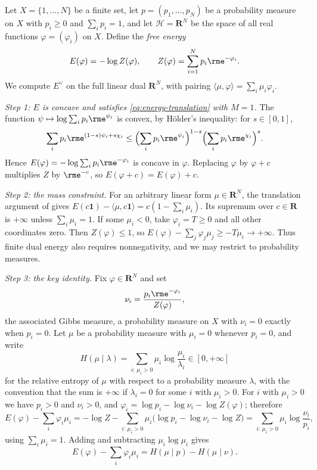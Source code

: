 \begin{example}
\label{ex:legendre-entropy-pair}
Let $X=\{1,\dots,N\}$ be a finite set, let $p=(p_1,\dots,p_N)$ be a
probability measure on $X$ with $p_i\geq0$ and $\sum_ip_i=1$, and let
$\mathcal H=\mathbf R^N$ be the space of all real functions
$\varphi=(\varphi_i)$ on $X$.  Define the \emph{free energy}
\[
 E(\varphi)=-\log Z(\varphi),
 \qquad
 Z(\varphi)=\sum_{i=1}^Np_i\rme^{-\varphi_i}.
\]
We compute $E^\vee$ on the full linear dual $\mathbf R^N$, with pairing
$\langle\mu,\varphi\rangle=\sum_i\mu_i\varphi_i$.

\emph{Step 1: $E$ is concave and satisfies \eqref{eq:energy-translation} with
$M=1$.}  The function $\psi\mapsto\log\sum_ip_i\rme^{\psi_i}$ is convex, by
H\"older's inequality: for $s\in[0,1]$,
\[
 \sum_ip_i\rme^{(1-s)\psi_i+s\chi_i}
 \leq\Bigl(\sum_ip_i\rme^{\psi_i}\Bigr)^{1-s}
     \Bigl(\sum_ip_i\rme^{\chi_i}\Bigr)^{s}.
\]
Hence $E(\varphi)=-\log\sum_ip_i\rme^{-\varphi_i}$ is concave in $\varphi$.
Replacing $\varphi$ by $\varphi+c$ multiplies $Z$ by $\rme^{-c}$, so
$E(\varphi+c)=E(\varphi)+c$.

\emph{Step 2: the mass constraint.}  For an arbitrary linear form
$\mu\in\mathbf R^N$, the translation argument of 
gives
$E(c\mathbf 1)-\langle\mu,c\mathbf 1\rangle=c(1-\sum_i\mu_i)$.
Its supremum over $c\in\mathbf R$ is $+\infty$ unless
$\sum_i\mu_i=1$.  If some $\mu_i<0$, take $\varphi_i=T\geq0$ and all other
coordinates zero.  Then $Z(\varphi)\leq1$, so
$E(\varphi)-\sum_j\varphi_j\mu_j\geq-T\mu_i\to+\infty$.
Thus finite dual energy also requires nonnegativity, and we may restrict
to probability measures.

\emph{Step 3: the key identity.}  Fix $\varphi\in\mathbf R^N$ and set
\[
 \nu_i=\frac{p_i\rme^{-\varphi_i}}{Z(\varphi)},
\]
the associated Gibbs measure, a probability measure on $X$ with $\nu_i=0$
exactly when $p_i=0$.  Let $\mu$ be a probability measure with
$\mu_i=0$ whenever $p_i=0$, and write
\[
 H(\mu\mid\lambda)=\sum_{i:\,\mu_i>0}\mu_i\log\frac{\mu_i}{\lambda_i}
 \in[0,+\infty]
\]
for the relative entropy of $\mu$ with respect to a probability measure
$\lambda$, with the convention that the sum is $+\infty$ if $\lambda_i=0$ for
some $i$ with $\mu_i>0$.  For $i$ with $\mu_i>0$ we have $p_i>0$ and
$\nu_i>0$, and
$\varphi_i=\log p_i-\log\nu_i-\log Z(\varphi)$; therefore
\[
 E(\varphi)-\sum_i\varphi_i\mu_i
 =-\log Z-\sum_{i:\,\mu_i>0}\mu_i
   \bigl(\log p_i-\log\nu_i-\log Z\bigr)
 =\sum_{i:\,\mu_i>0}\mu_i\log\frac{\nu_i}{p_i},
\]
using $\sum_i\mu_i=1$.  Adding and subtracting $\mu_i\log\mu_i$ gives
\begin{equation}
\label{eq:gibbs-identity}
 E(\varphi)-\sum_i\varphi_i\mu_i
 =H(\mu\mid p)-H(\mu\mid\nu).
\end{equation}


\end{example}
